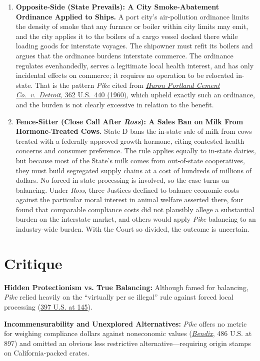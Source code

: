 \documentclass[12pt]{article}
\begin{document}
\begin{enumerate}
\item \textbf{Opposite-Side (State Prevails): A City Smoke-Abatement Ordinance Applied to Ships.} A port city's air-pollution ordinance limits the density of smoke that any furnace or boiler within city limits may emit, and the city applies it to the boilers of a cargo vessel docked there while loading goods for interstate voyages. The shipowner must refit its boilers and argues that the ordinance burdens interstate commerce. The ordinance regulates evenhandedly, serves a legitimate local health interest, and has only incidental effects on commerce; it requires no operation to be relocated in-state. That is the pattern \textit{Pike} cited from \href{https://supreme.justia.com/cases/federal/us/362/440/}{\textit{Huron Portland Cement Co.\ v.\ Detroit}, 362 U.S.\ 440 (1960)}, which upheld exactly such an ordinance, and the burden is not clearly excessive in relation to the benefit.

\item \textbf{Fence-Sitter (Close Call After \textit{Ross}): A Sales Ban on Milk From Hormone-Treated Cows.} State D bans the in-state sale of milk from cows treated with a federally approved growth hormone, citing contested health concerns and consumer preference. The rule applies equally to in-state dairies, but because most of the State's milk comes from out-of-state cooperatives, they must build segregated supply chains at a cost of hundreds of millions of dollars. No forced in-state processing is involved, so the case turns on balancing. Under \textit{Ross}, three Justices declined to balance economic costs against the particular moral interest in animal welfare asserted there, four found that comparable compliance costs did not plausibly allege a substantial burden on the interstate market, and others would apply \textit{Pike} balancing to an industry-wide burden. With the Court so divided, the outcome is uncertain.

\end{enumerate}

\section{Critique}
\textbf{Hidden Protectionism vs. True Balancing:} Although famed for balancing, \textit{Pike} relied heavily on the ``virtually per se illegal'' rule against forced local processing (\href{https://supreme.justia.com/cases/federal/us/397/137/}{397 U.S. at 145}).

\textbf{Incommensurability and Unexplored Alternatives:} \textit{Pike} offers no metric for weighing compliance dollars against noneconomic values (\href{https://supreme.justia.com/cases/federal/us/486/888/}{\textit{Bendix}}, 486 U.S. at 897) and omitted an obvious less restrictive alternative---requiring origin stamps on California-packed crates.
\end{document}

